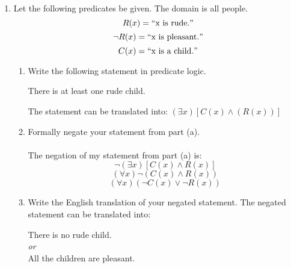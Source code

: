 \documentclass[12pt]{article}
\begin{document}
\begin{enumerate}
      \item Let the following predicates be given. The domain is all people.
            \[R(x) = \text{\textquotedblleft} \text{x is rude.} \text{\textquotedblright}\]
            \[\neg R(x) = \text{\textquotedblleft} \text{x is pleasant.} \text{\textquotedblright}\]
            \[C(x) = \text{\textquotedblleft} \text{x is a child.} \text{\textquotedblright}\]
            \begin{enumerate}
                  \item Write the following statement in predicate logic.
                        \begin{center}
                              There is at least one rude child.
                        \end{center}
                        The statement can be translated into: $(\exists x)[C(x)\wedge(R(x))]$
                  \item Formally negate your statement from part (a).\\~\\
                        The negation of my statement from part (a) is:
                        \[\neg (\exists x)[C(x) \wedge R(x)]\]
                        \[(\forall x)\neg(C(x) \wedge R(x))\]
                        \[(\forall x)(\neg C(x) \vee \neg R(x))\]
                  \item Write the English translation of your negated statement.
                        The negated statement can be translated into:
                        \begin{center}
                              There is no rude child.\\
                              \textit{or}\\
                              All the children are pleasant.
                        \end{center}


\end{enumerate}
\end{enumerate}
\end{document}
